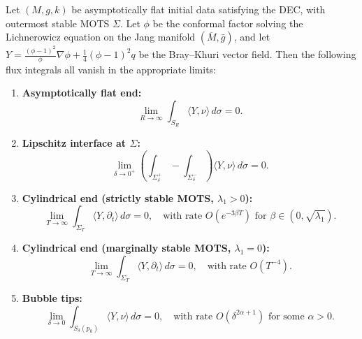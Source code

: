 \begin{proposition}\label{prop:FluxIntegralVerification}
Let $(M, g, k)$ be asymptotically flat initial data satisfying the DEC, with outermost stable MOTS $\Sigma$. Let $\phi$ be the conformal factor solving the Lichnerowicz equation on the Jang manifold $(\overline{M}, \bar{g})$, and let $Y = \frac{(\phi-1)^2}{\phi}\nabla\phi + \frac{1}{4}(\phi-1)^2 q$ be the Bray--Khuri vector field. Then the following flux integrals all vanish in the appropriate limits:

\begin{enumerate}
    \item \textbf{Asymptotically flat end:}
    \begin{equation}
        \lim_{R \to \infty} \int_{S_R} \langle Y, \nu \rangle \, d\sigma = 0.
    \end{equation}
    
    \item \textbf{Lipschitz interface at $\Sigma$:}
    \begin{equation}
        \lim_{\delta \to 0^+} \left( \int_{\Sigma^+_\delta} - \int_{\Sigma^-_\delta} \right) \langle Y, \nu \rangle \, d\sigma = 0.
    \end{equation}
    
    \item \textbf{Cylindrical end (strictly stable MOTS, $\lambda_1 > 0$):}
    \begin{equation}
        \lim_{T \to \infty} \int_{\Sigma_T} \langle Y, \partial_t \rangle \, d\sigma = 0, \quad \text{with rate } O(e^{-3\beta T}) \text{ for } \beta \in (0, \sqrt{\lambda_1}).
    \end{equation}
    
    \item \textbf{Cylindrical end (marginally stable MOTS, $\lambda_1 = 0$):}
    \begin{equation}
        \lim_{T \to \infty} \int_{\Sigma_T} \langle Y, \partial_t \rangle \, d\sigma = 0, \quad \text{with rate } O(T^{-4}).
    \end{equation}
    
    \item \textbf{Bubble tips:}
    \begin{equation}
        \lim_{\delta \to 0} \int_{S_\delta(p_k)} \langle Y, \nu \rangle \, d\sigma = 0, \quad \text{with rate } O(\delta^{2\alpha + 1}) \text{ for some } \alpha > 0.
    \end{equation}
\end{enumerate}


\end{proposition}
